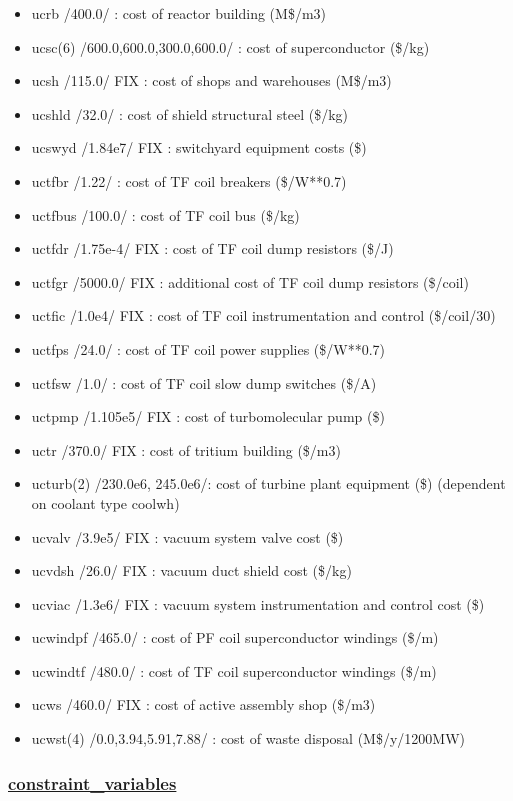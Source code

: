 \documentclass[]{article}
\begin{document}
\begin{itemize}
\item
  ucrb /400.0/ : cost of reactor building (M\$/m3)
\item
  ucsc(6) /600.0,600.0,300.0,600.0/ : cost of superconductor (\$/kg)
\item
  ucsh /115.0/ FIX : cost of shops and warehouses (M\$/m3)
\item
  ucshld /32.0/ : cost of shield structural steel (\$/kg)
\item
  ucswyd /1.84e7/ FIX : switchyard equipment costs (\$)
\item
  uctfbr /1.22/ : cost of TF coil breakers (\$/W**0.7)
\item
  uctfbus /100.0/ : cost of TF coil bus (\$/kg)
\item
  uctfdr /1.75e-4/ FIX : cost of TF coil dump resistors (\$/J)
\item
  uctfgr /5000.0/ FIX : additional cost of TF coil dump resistors
  (\$/coil)
\item
  uctfic /1.0e4/ FIX : cost of TF coil instrumentation and control
  (\$/coil/30)
\item
  uctfps /24.0/ : cost of TF coil power supplies (\$/W**0.7)
\item
  uctfsw /1.0/ : cost of TF coil slow dump switches (\$/A)
\item
  uctpmp /1.105e5/ FIX : cost of turbomolecular pump (\$)
\item
  uctr /370.0/ FIX : cost of tritium building (\$/m3)
\item
  ucturb(2) /230.0e6, 245.0e6/: cost of turbine plant equipment (\$)
  (dependent on coolant type coolwh)
\item
  ucvalv /3.9e5/ FIX : vacuum system valve cost (\$)
\item
  ucvdsh /26.0/ FIX : vacuum duct shield cost (\$/kg)
\item
  ucviac /1.3e6/ FIX : vacuum system instrumentation and control cost
  (\$)
\item
  ucwindpf /465.0/ : cost of PF coil superconductor windings (\$/m)
\item
  ucwindtf /480.0/ : cost of TF coil superconductor windings (\$/m)
\item
  ucws /460.0/ FIX : cost of active assembly shop (\$/m3)
\item
  ucwst(4) /0.0,3.94,5.91,7.88/ : cost of waste disposal (M\$/y/1200MW)
\end{itemize}

\hypertarget{constraint_variables}{%
\subsubsection{\texorpdfstring{\href{constraint_variables.html}{constraint\_variables}}{constraint\_variables}}\label{constraint_variables}}
\end{document}
